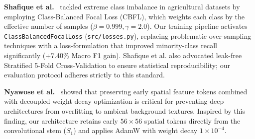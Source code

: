 \documentclass[conference]{IEEEtran}
\begin{document}
\textbf{Shafique et al.}~\cite{shafique2026} tackled extreme class imbalance in agricultural datasets by employing Class-Balanced Focal Loss (CBFL), which weights each class by the effective number of samples ($\beta = 0.999, \gamma = 2.0$). Our training pipeline activates \texttt{ClassBalancedFocalLoss} (\texttt{src/losses.py}), replacing problematic over-sampling techniques with a loss-formulation that improved minority-class recall significantly (+7.40\% Macro F1 gain). Shafique et al. also advocated leak-free Stratified 5-Fold Cross-Validation to ensure statistical reproducibility; our evaluation protocol adheres strictly to this standard.

\textbf{Nyawose et al.}~\cite{nyawose2026} showed that preserving early spatial feature tokens combined with decoupled weight decay optimization is critical for preventing deep architectures from overfitting to ambient background textures. Inspired by this finding, our architecture retains early $56 \times 56$ spatial tokens directly from the convolutional stem ($S_1$) and applies AdamW with weight decay $1 \times 10^{-4}$.
\end{document}
